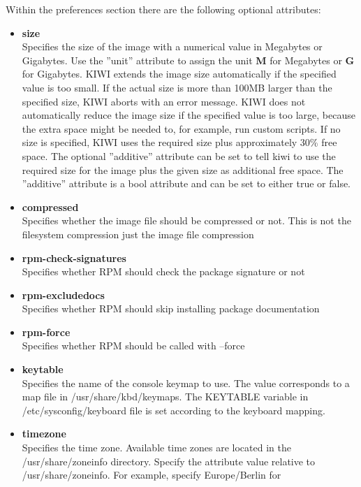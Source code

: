 Within the preferences section there are the following optional
attributes:

\begin{itemize}
\item \textbf{size}\\
      Specifies the size of the image with a numerical value in
      Megabytes or Gigabytes. Use the ''unit'' attribute to assign the
      unit \textbf{M} for Megabytes or \textbf{G} for Gigabytes.
      KIWI extends the image size automatically if the specified value
      is too small. If the actual size is more than 100MB larger than
      the specified size, KIWI aborts with an error
      message. KIWI does not automatically reduce the image size if
      the specified value is too large, because the extra space might
      be needed to, for example, run custom scripts. If no size is
      specified, KIWI uses the required size plus approximately
      30\% free space. The optional ''additive'' attribute can be set
      to tell kiwi to use the required size for the image plus the
      given size as additional free space. The ''additive'' attribute is
      a bool attribute and can be set to either true or false.
\item \textbf{compressed}\\
      Specifies whether the image file should be compressed or not.
      This is not the filesystem compression just the image file compression
\item \textbf{rpm-check-signatures}\\
      Specifies whether RPM should check the package signature or not
\item \textbf{rpm-excludedocs}\\
      Specifies whether RPM should skip installing package documentation
\item \textbf{rpm-force}\\
      Specifies whether RPM should be called with --force
\item \textbf{keytable}\\
      Specifies the name of the console keymap to use. The value corresponds
      to a map file in /usr/share/kbd/keymaps. The KEYTABLE variable in
      /etc/sysconfig/keyboard file is set according to the keyboard
      mapping.
\item \textbf{timezone}\\
      Specifies the time zone. Available time zones are located in the
      /usr/share/zoneinfo directory. Specify the attribute value relative to
      /usr/share/zoneinfo. For example, specify Europe/Berlin for

\end{itemize}

